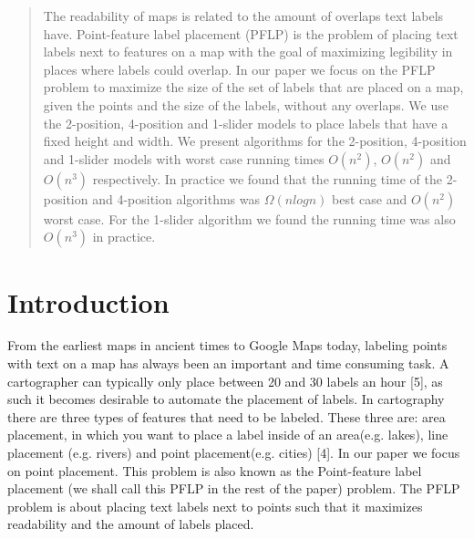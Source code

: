 \documentclass[crop=false,a4paper,oneside,11pt]{standalone}
\begin{document}
\begin{abstract}
The readability of maps is related to the amount of overlaps text labels have. Point-feature label placement (PFLP) is the problem of placing text labels next to features on a map with the goal of maximizing legibility in places where labels could overlap. In our paper we focus on the PFLP problem to maximize the size of the set of labels that are placed on a map, given the points and the size of the labels, without any overlaps. We use the 2-position, 4-position and 1-slider models to place labels that have a fixed height and width. We present algorithms for the 2-position, 4-position and 1-slider models with worst case running times $O(n^2)$, $O(n^2)$ and $O(n^3)$ respectively. In practice we found that the running time of the 2-position and 4-position algorithms was $\Omega(nlogn)$ best case and $O(n^2)$ worst case. For the 1-slider algorithm we found the running time was also $O(n^3)$ in practice.
\end{abstract}

\section{Introduction}
From the earliest maps in ancient times to Google Maps today, labeling points with text on a map has always been an important and time consuming task. A cartographer can typically only place between 20 and 30 labels an hour [5], as such it becomes desirable to automate the placement of labels. In cartography there are three types of features that need to be labeled. These three are: area placement, in which you want to place a label inside of an area(e.g. lakes), line placement (e.g. rivers) and point placement(e.g. cities) [4]. In our paper we focus on point placement. This problem is also known as the Point-feature label placement (we shall call this PFLP in the rest of the paper) problem. The PFLP problem is about placing text labels next to points such that it maximizes readability and the amount of labels placed.
\end{document}
